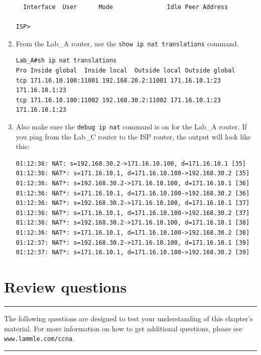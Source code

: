 \documentclass[b5paper,11pt]{memoir}
\begin{document}
\begin{enumerate}
\begin{verbatim}
  Interface  User      Mode               Idle Peer Address
 
ISP>
\end{verbatim}
\item
  From the Lab\_A router, use the \texttt{show\ ip\ nat\ translations}
  command.

\begin{verbatim}
Lab_A#sh ip nat translations
Pro Inside global  Inside local  Outside local Outside global
tcp 171.16.10.100:11001 192.168.20.2:11001 171.16.10.1:23    
171.16.10.1:23
tcp 171.16.10.100:11002 192.168.30.2:11002 171.16.10.1:23    
171.16.10.1:23
\end{verbatim}
\item
  Also make sure the \texttt{debug\ ip\ nat} command is on for the
  Lab\_A router. If you ping from the Lab\_C router to the ISP router,
  the output will look like this:

\begin{verbatim}
01:12:36: NAT: s=192.168.30.2->171.16.10.100, d=171.16.10.1 [35]
01:12:36: NAT*: s=171.16.10.1, d=171.16.10.100->192.168.30.2 [35]
01:12:36: NAT*: s=192.168.30.2->171.16.10.100, d=171.16.10.1 [36]
01:12:36: NAT*: s=171.16.10.1, d=171.16.10.100->192.168.30.2 [36]
01:12:36: NAT*: s=192.168.30.2->171.16.10.100, d=171.16.10.1 [37]
01:12:36: NAT*: s=171.16.10.1, d=171.16.10.100->192.168.30.2 [37]
01:12:36: NAT*: s=192.168.30.2->171.16.10.100, d=171.16.10.1 [38]
01:12:36: NAT*: s=171.16.10.1, d=171.16.10.100->192.168.30.2 [38]
01:12:37: NAT*: s=192.168.30.2->171.16.10.100, d=171.16.10.1 [39]
01:12:37: NAT*: s=171.16.10.1, d=171.16.10.100->192.168.30.2 [39]
\end{verbatim}
\end{enumerate}



\section{Review questions}

\begin{center}\rule{0.5\linewidth}{0.5pt}\end{center}


The
following questions are designed to test your understanding of this
chapter's material. For more information on how to get additional
questions, please see \texttt{www.lammle.com/ccna}.

\begin{center}\rule{0.5\linewidth}{0.5pt}\end{center}
\end{document}

